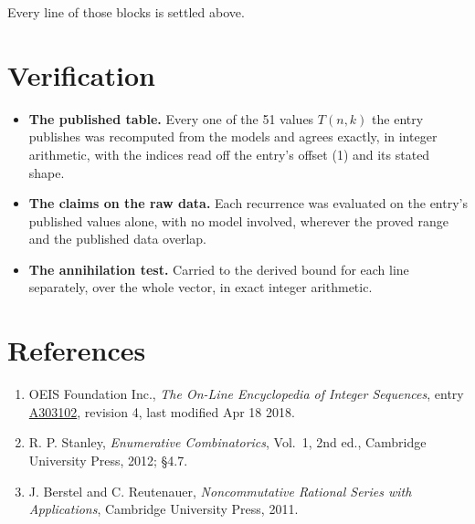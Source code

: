 \documentclass[11pt]{article}
\theoremstyle{definition}
\begin{document}
Every line of those blocks is settled above.

\section{Verification}

\begin{itemize}

\item {\bfseries The published table.} Every one of the 51 values $T(n,k)$ the entry publishes was recomputed from the models and agrees exactly, in integer arithmetic, with the indices read off the entry's offset (1) and its stated shape.

\item {\bfseries The claims on the raw data.} Each recurrence was evaluated on the entry's published values alone, with no model involved, wherever the proved range and the published data overlap.

\item {\bfseries The annihilation test.} Carried to the derived bound for each line separately, over the whole vector, in exact integer arithmetic.

\end{itemize}

\section{References}

\begin{enumerate}

\item OEIS Foundation Inc., \emph{The On-Line Encyclopedia of Integer Sequences}, entry \href{https://oeis.org/A303102}{A303102}, revision 4, last modified Apr 18 2018.

\item R. P. Stanley, \emph{Enumerative Combinatorics}, Vol.~1, 2nd ed., Cambridge University Press, 2012; \S4.7.

\item J. Berstel and C. Reutenauer, \emph{Noncommutative Rational Series with Applications}, Cambridge University Press, 2011.

\end{enumerate}
\end{document}
